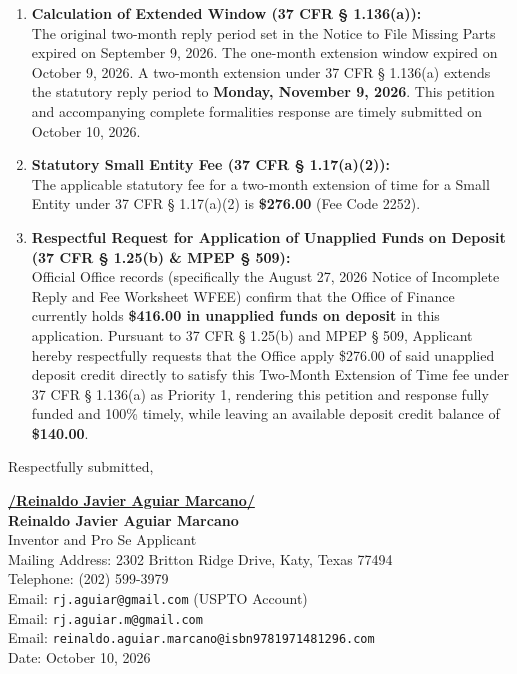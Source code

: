 \documentclass[11pt,letterpaper]{article}
\begin{document}
\begin{enumerate}[leftmargin=*]
    \item \textbf{Calculation of Extended Window (37 CFR \S{} 1.136(a)):} \\
    The original two-month reply period set in the Notice to File Missing Parts expired on September 9, 2026. The one-month extension window expired on October 9, 2026. A two-month extension under 37 CFR \S{} 1.136(a) extends the statutory reply period to \textbf{Monday, November 9, 2026}. This petition and accompanying complete formalities response are timely submitted on October 10, 2026.

    \item \textbf{Statutory Small Entity Fee (37 CFR \S{} 1.17(a)(2)):} \\
    The applicable statutory fee for a two-month extension of time for a Small Entity under 37 CFR \S{} 1.17(a)(2) is \textbf{\$276.00} (Fee Code 2252).

    \item \textbf{Respectful Request for Application of Unapplied Funds on Deposit (37 CFR \S{} 1.25(b) \& MPEP \S{} 509):} \\
    Official Office records (specifically the August 27, 2026 Notice of Incomplete Reply and Fee Worksheet WFEE) confirm that the Office of Finance currently holds \textbf{\$416.00 in unapplied funds on deposit} in this application. Pursuant to 37 CFR \S{} 1.25(b) and MPEP \S{} 509, Applicant hereby respectfully requests that the Office apply \$276.00 of said unapplied deposit credit directly to satisfy this Two-Month Extension of Time fee under 37 CFR \S{} 1.136(a) as Priority 1, rendering this petition and response fully funded and 100\% timely, while leaving an available deposit credit balance of \textbf{\$140.00}.
\end{enumerate}

\vspace{0.6cm}
\begin{singlespace}
\noindent Respectfully submitted, \par\vspace{0.8cm}
\underline{\textbf{/Reinaldo Javier Aguiar Marcano/}} \\
\textbf{Reinaldo Javier Aguiar Marcano} \\
Inventor and Pro Se Applicant \\
Mailing Address: 2302 Britton Ridge Drive, Katy, Texas 77494 \\
Telephone: (202) 599-3979 \\
Email: \texttt{rj.aguiar@gmail.com} (USPTO Account) \\
Email: \texttt{rj.aguiar.m@gmail.com} \\
Email: \texttt{reinaldo.aguiar.marcano@isbn9781971481296.com} \\
Date: October 10, 2026
\end{singlespace}
\end{document}
